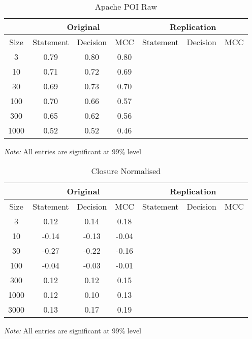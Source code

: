 \begin{table}[h]
	\caption{Apache POI Raw}
	\label{tab:closureraw}
	\begin{minipage}{0.7\columnwidth}
		\begin{center}
			\begin{tabular}{cccc|ccc}
				\toprule
				& \multicolumn{3}{c}{Original} & \multicolumn{3}{c}{Replication} \\
				\hline
				Size & Statement & Decision & MCC & Statement & Decision & MCC  \\
				\hline
				3   & 0.79 & 0.80 & 0.80 &  &  & \\
				10  & 0.71 & 0.72 & 0.69 &  &  & \\
				30  & 0.69 & 0.73 & 0.70 &   &   &  \\
				100 & 0.70 & 0.66 & 0.57 &   &   &  \\
				300 & 0.65 & 0.62 & 0.56 &   &   &  \\
				1000 & 0.52 & 0.52 & 0.46 &  &  &  \\
				\bottomrule
			\end{tabular}
		\end{center}
		\bigskip
		\emph{Note:} All entries are significant at 99\% level
	\end{minipage}
\end{table}

\begin{table}[h]
	\caption{Closure Normalised}
	\label{tab:closurenorm}
	\begin{minipage}{0.7\columnwidth}
		\begin{center}
			\begin{tabular}{cccc|ccc}
				\toprule
				& \multicolumn{3}{c}{Original} & \multicolumn{3}{c}{Replication} \\
				\hline
				Size & Statement & Decision & MCC & Statement & Decision & MCC  \\
				\hline
				3   & 0.12 & 0.14 & 0.18 &  &  &  \\
				10  & -0.14 & -0.13 & -0.04\textborn & &&\\
				30  & -0.27 & -0.22 & -0.16 & && \\
				100 & -0.04\textborn & -0.03\textborn & -0.01\textborn & && \\
				300 & 0.12 & 0.12 & 0.15 & && \\
				1000 & 0.12 & 0.10 & 0.13 & && \\
				3000 & 0.13 & 0.17 & 0.19 &&&\\
				\bottomrule
			\end{tabular}
		\end{center}
		\bigskip
		\emph{Note:} All entries are significant at 99\% level
	\end{minipage}
\end{table}
 
